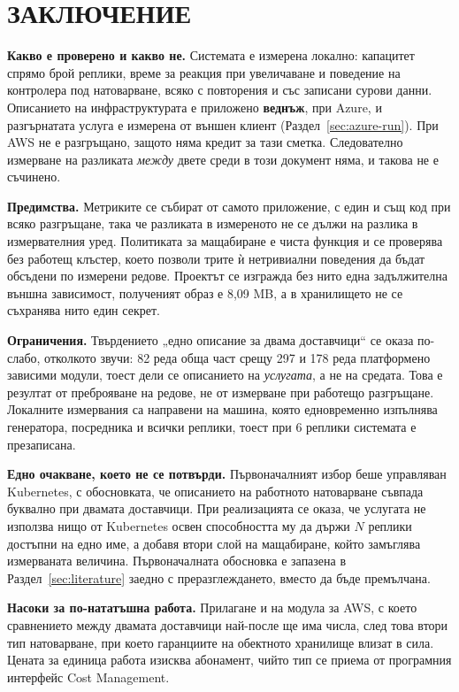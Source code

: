 \section*{ЗАКЛЮЧЕНИЕ}
\label{sec:conclusion}

\textbf{Какво е проверено и какво не.} Системата е измерена локално: капацитет спрямо брой
реплики, време за реакция при увеличаване и поведение на контролера под натоварване, всяко с
повторения и със записани сурови данни. Описанието на инфраструктурата е приложено
\textbf{веднъж}, при Azure, и разгърнатата услуга е измерена от външен клиент
(Раздел~\ref{sec:azure-run}). При AWS не е разгръщано, защото няма кредит за тази сметка.
Следователно измерване на разликата \emph{между} двете среди в този документ няма, и такова не е
съчинено.

\textbf{Предимства.} Метриките се събират от самото приложение, с един и същ код при всяко
разгръщане, така че разликата в измереното не се дължи на разлика в измервателния уред.
Политиката за мащабиране е чиста функция и се проверява без работещ клъстер, което позволи
трите ѝ нетривиални поведения да бъдат обсъдени по измерени редове. Проектът се изгражда без
нито една задължителна външна зависимост, полученият образ е 8{,}09 MB, а в хранилището не се
съхранява нито един секрет.

\textbf{Ограничения.} Твърдението „едно описание за двама доставчици“ се оказа по-слабо, отколкото
звучи: 82 реда обща част срещу 297 и 178 реда платформено зависими модули, тоест дели се
описанието на \emph{услугата}, а не на средата. Това е резултат от преброяване на редове, не от
измерване при работещо разгръщане. Локалните измервания са направени на машина, която
едновременно изпълнява генератора, посредника и всички реплики, тоест при 6 реплики системата е
презаписана.

\textbf{Едно очакване, което не се потвърди.} Първоначалният избор беше управляван Kubernetes, с
обосновката, че описанието на работното натоварване съвпада буквално при двамата доставчици. При
реализацията се оказа, че услугата не използва нищо от Kubernetes освен способността му да държи
$N$ реплики достъпни на едно име, а добавя втори слой на мащабиране, който замъглява измерваната
величина. Първоначалната обосновка е запазена в Раздел~\ref{sec:literature} заедно с
преразглеждането, вместо да бъде премълчана.

\textbf{Насоки за по-нататъшна работа.} Прилагане и на модула за AWS, с което сравнението между
двамата доставчици най-после ще има числа, след това втори тип натоварване, при което гаранциите на
обектното хранилище влизат в сила. Цената за единица работа изисква абонамент, чийто тип се приема
от програмния интерфейс Cost Management.
